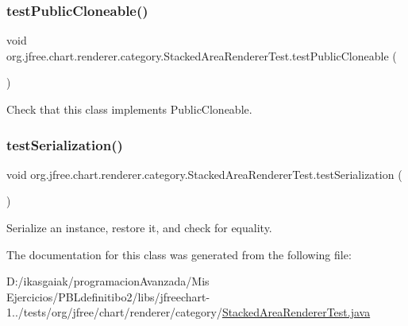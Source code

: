 \subsubsection{\texorpdfstring{test\+Public\+Cloneable()}{testPublicCloneable()}}
{\footnotesize\ttfamily void org.\+jfree.\+chart.\+renderer.\+category.\+Stacked\+Area\+Renderer\+Test.\+test\+Public\+Cloneable (\begin{DoxyParamCaption}{ }\end{DoxyParamCaption})}

Check that this class implements Public\+Cloneable. \mbox{\label{classorg_1_1jfree_1_1chart_1_1renderer_1_1category_1_1_stacked_area_renderer_test_a688ad0c396288595f068238230718ca8}} 
\subsubsection{\texorpdfstring{test\+Serialization()}{testSerialization()}}
{\footnotesize\ttfamily void org.\+jfree.\+chart.\+renderer.\+category.\+Stacked\+Area\+Renderer\+Test.\+test\+Serialization (\begin{DoxyParamCaption}{ }\end{DoxyParamCaption})}

Serialize an instance, restore it, and check for equality. 

The documentation for this class was generated from the following file\+:\begin{DoxyCompactItemize}
\item 
D\+:/ikasgaiak/programacion\+Avanzada/\+Mis Ejercicios/\+P\+B\+Ldefinitibo2/libs/jfreechart-\/1../tests/org/jfree/chart/renderer/category/\mbox{\hyperlink{_stacked_area_renderer_test_8java}{Stacked\+Area\+Renderer\+Test.\+java}}\end{DoxyCompactItemize}
